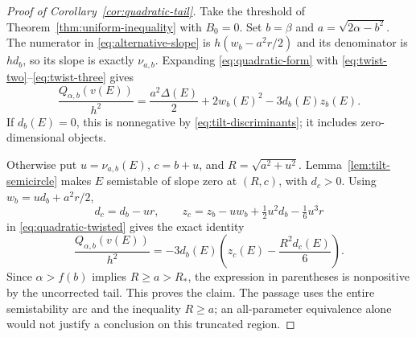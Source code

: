 \begin{proof}[Proof of Corollary~\ref{cor:quadratic-tail}]
Take the threshold of Theorem~\ref{thm:uniform-inequality} with
$B_0=0$.  Set $b=\beta$ and $a=\sqrt{2\alpha-b^2}$.
The numerator in \eqref{eq:alternative-slope} is
$h(w_b-a^2r/2)$ and its denominator is $hd_b$, so its slope is
exactly $\nu_{a,b}$.  Expanding \eqref{eq:quadratic-form} with
\eqref{eq:twist-two}--\eqref{eq:twist-three} gives
\begin{equation}\label{eq:quadratic-twisted}
 \frac{Q_{\alpha,b}(v(E))}{h^2}
    =\frac{a^2\Delta(E)}2+2w_b(E)^2-3d_b(E)z_b(E).
\end{equation}
If $d_b(E)=0$, this is nonnegative by
\eqref{eq:tilt-discriminants}; it includes zero-dimensional objects.

Otherwise put $u=\nu_{a,b}(E)$, $c=b+u$, and
$R=\sqrt{a^2+u^2}$.  Lemma~\ref{lem:tilt-semicircle} makes $E$
semistable of slope zero at $(R,c)$, with $d_c>0$.
Using $w_b=ud_b+a^2r/2$,
\[
 d_c=d_b-ur,\qquad
 z_c=z_b-uw_b+\tfrac12u^2d_b-\tfrac16u^3r
\]
in \eqref{eq:quadratic-twisted} gives the exact identity
\begin{equation}\label{eq:quadratic-zero-slope-identity}
 \frac{Q_{\alpha,b}(v(E))}{h^2}
       =-3d_b(E)\left(z_c(E)-\frac{R^2d_c(E)}6\right).
\end{equation}
Since $\alpha>f(b)$ implies $R\ge a>R_*$, the expression in
parentheses is nonpositive by the uncorrected tail.  This proves the
claim.  The passage uses the entire semistability arc and the
inequality $R\ge a$; an all-parameter equivalence alone would not
justify a conclusion on this truncated region.
\end{proof}
